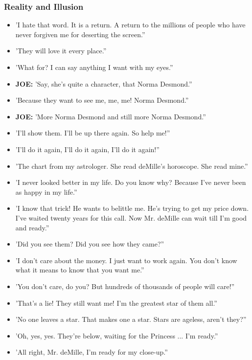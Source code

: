 \documentclass[a4paper]{article}
\begin{document}
\subsubsection{Reality and Illusion}
\begin{itemize}
\item 'I hate that word. It is a return. A return to the millions of people who have never forgiven me for deserting the screen.”
\item 'They will love it every place.”
\item 'What for? I can say anything I want with my eyes.”
\item \textbf{JOE:} 'Say, she's quite a character, that Norma Desmond.”
\item 'Because they want to see me, me, me! Norma Desmond.”
\item \textbf{JOE:} 'More Norma Desmond and still more Norma Desmond.”
\item 'I'll show them. I'll be up there again. So help me!”
\item 'I'll do it again, I'll do it again, I'll do it again!”
\item 'The chart from my astrologer. She read deMille's horoscope. She read mine.”
\item 'I never looked better in my life. Do you know why? Because I've never been as happy in my life.”
\item 'I know that trick! He wants to belittle me. He's trying to get my price down. I've waited twenty years for this call. Now Mr. deMille can wait till I'm good and ready.”
\item 'Did you see them? Did you see how they came?”
\item 'I don't care about the money. I just want to work again. You don't know what it means to know that you want me.”
\item 'You don't care, do you? But hundreds of thousands of people will care!”
\item 'That's a lie! They still want me! I'm the greatest star of them all.”
\item 'No one leaves a star. That makes one a star. Stars are ageless, aren't they?”
\item 'Oh, yes, yes. They're below, waiting for the Princess ... I'm ready.”
\item 'All right, Mr. deMille, I'm ready for my close-up.”
\end{itemize}
\end{document}
